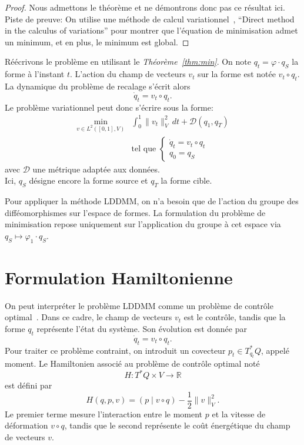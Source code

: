 \documentclass[12pt]{report}
\begin{document}
\begin{proof}
Nous admettons le théorème et ne démontrons donc pas ce résultat ici. Piste de preuve: On utilise une méthode de calcul variationnel~\cite{MP25}, ``Direct method in the calculus of variations'' pour montrer que l'équation de minimisation admet un minimum, et en plus, le minimum est global.
\end{proof}

Réécrivons le problème en utilisant le \textit{Théorème~\ref{thm:min}}. On note $q_t=\varphi\cdot q_S$ la forme à l'instant $t$. L'action du champ de vecteurs $v_t$ sur la forme est notée $v_t\circ q_t$.\\
La dynamique du problème de recalage s'écrit alors
\[
\dot q_t = v_t\circ q_t.
\]
Le problème variationnel peut donc s'écrire sous la forme:
\[
\begin{aligned}
\min_{v\in L^2([0,1],V)}&\int_0^1 \|v_t\|_V^2\,dt + \mathcal{D}(q_1,q_T)\\
&\text{tel que }\left\{\begin{array}{ll}\dot q_t = v_t\circ q_t\\ q_0=q_S\end{array}\right.
\end{aligned}
\]
avec $\mathcal{D}$ une métrique adaptée aux données.\\
Ici, $q_S$ désigne encore la forme source et $q_T$ la forme cible.

\begin{remark}
Pour appliquer la méthode LDDMM, on n'a besoin que de l'action du groupe des difféomorphismes sur l'espace de formes. La formulation du problème de minimisation repose uniquement sur l'application du groupe à cet espace via $q_S \mapsto \varphi_1\cdot q_S$.
\end{remark}


\section{Formulation Hamiltonienne}
On peut interpréter le problème LDDMM comme un problème de contrôle optimal~\cite{TB16}. Dans ce cadre, le champ de vecteurs $v_t$ est le contrôle, tandis que la forme $q_t$ représente l'état du système. Son évolution est donnée par
\[
\dot q_t = v_t\circ q_t.
\]
Pour traiter ce problème contraint, on introduit un covecteur $p_t\in T_{q_t}^*Q$, appelé moment. Le Hamiltonien associé au problème de contrôle optimal noté
\[
H:T^*Q\times V\longrightarrow \mathbb{R}
\]
est défini par
\[
H(q,p,v)=(p\mid v\circ q)-\frac{1}{2}\|v\|_V^2.
\]
Le premier terme mesure l'interaction entre le moment $p$ et la vitesse de déformation $v\circ q$, tandis que le second représente le coût énergétique du champ de vecteurs $v$.
\end{document}
